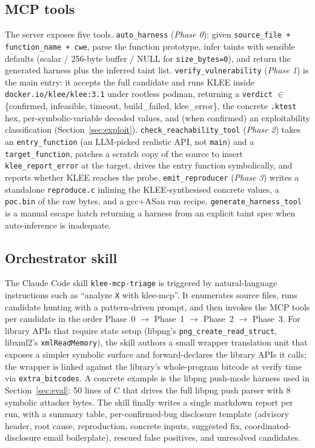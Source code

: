 \documentclass[3p,times,procedia]{elsarticle}
\begin{document}
\subsection{MCP tools}
\label{sec:tools}

The server exposes five tools. \texttt{auto\_harness} (\emph{Phase 0}): given \texttt{source\_file + function\_name + cwe}, parse the function prototype, infer taints with sensible defaults (scalar / 256-byte buffer / NULL for \texttt{size\_bytes=0}), and return the generated harness plus the inferred taint list. \texttt{verify\_vulnerability} (\emph{Phase 1}) is the main entry: it accepts the full candidate and runs KLEE inside \texttt{docker.io/klee/klee:3.1} under rootless podman, returning a \texttt{verdict} $\in$ \{confirmed, infeasible, timeout, build\_failed, klee\_error\}, the concrete \texttt{.ktest} hex, per-symbolic-variable decoded values, and (when confirmed) an exploitability classification (Section~\ref{sec:exploit}). \texttt{check\_reachability\_tool} (\emph{Phase 2}) takes an \texttt{entry\_function} (an LLM-picked realistic API, not \texttt{main}) and a \texttt{target\_function}, patches a scratch copy of the source to insert \texttt{klee\_report\_error} at the target, drives the entry function symbolically, and reports whether KLEE reaches the probe. \texttt{emit\_reproducer} (\emph{Phase 3}) writes a standalone \texttt{reproduce.c} inlining the KLEE-synthesised concrete values, a \texttt{poc.bin} of the raw bytes, and a gcc+ASan run recipe. \texttt{generate\_harness\_tool} is a manual escape hatch returning a harness from an explicit taint spec when auto-inference is inadequate.

\subsection{Orchestrator skill}
\label{sec:skill}

The Claude Code skill \texttt{klee-mcp-triage} is triggered by natural-language instructions such as ``analyze \texttt{X} with klee-mcp''. It enumerates source files, runs candidate hunting with a pattern-driven prompt, and then invokes the MCP tools per candidate in the order Phase~0 $\rightarrow$ Phase~1 $\rightarrow$ Phase~2 $\rightarrow$ Phase~3. For library APIs that require state setup (libpng's \texttt{png\_create\_read\_struct}, libxml2's \texttt{xmlReadMemory}), the skill authors a small wrapper translation unit that exposes a simpler symbolic surface and forward-declares the library APIs it calls; the wrapper is linked against the library's whole-program bitcode at verify time via \texttt{extra\_bitcodes}. A concrete example is the libpng push-mode harness used in Section~\ref{sec:eval}: 50 lines of C that drives the full libpng push parser with 8 symbolic attacker bytes. The skill finally writes a single markdown report per run, with a summary table, per-confirmed-bug disclosure template (advisory header, root cause, reproduction, concrete inputs, suggested fix, coordinated-disclosure email boilerplate), rescued false positives, and unresolved candidates.
\end{document}
